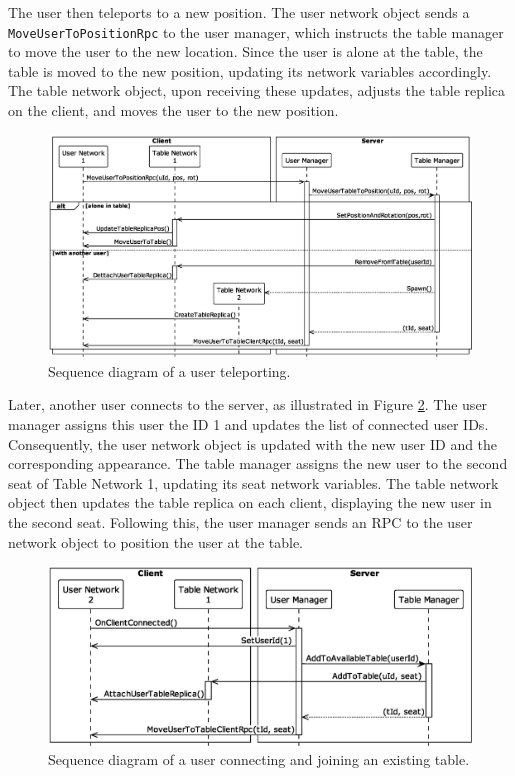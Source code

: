         The user then teleports to a new position. The user network object sends a \lstinline{MoveUserToPositionRpc} to the user manager, which instructs the table manager to move the user to the new location. Since the user is alone at the table, the table is moved to the new position, updating its network variables accordingly. The table network object, upon receiving these updates, adjusts the table replica on the client, and moves the user to the new position.

        \begin{figure}[h]
            \centering
            \includegraphics[width=.85\linewidth]{diagrams/out/teleport.eps}
            \caption{Sequence diagram of a user teleporting.}
            \label{fig:teleport}
        \end{figure}

        Later, another user connects to the server, as illustrated in Figure \ref{fig:connect_and_join}. The user manager assigns this user the ID 1 and updates the list of connected user IDs. Consequently, the user network object is updated with the new user ID and the corresponding appearance. The table manager assigns the new user to the second seat of Table Network 1, updating its seat network variables. The table network object then updates the table replica on each client, displaying the new user in the second seat. Following this, the user manager sends an RPC to the user network object to position the user at the table.

        \begin{figure}[ht!]
            \centering
            \includegraphics[width=.85\linewidth]{diagrams/out/connect_and_join_existing_table.eps}
            \caption{Sequence diagram of a user connecting and joining an existing table.}
            \label{fig:connect_and_join}
        \end{figure}

